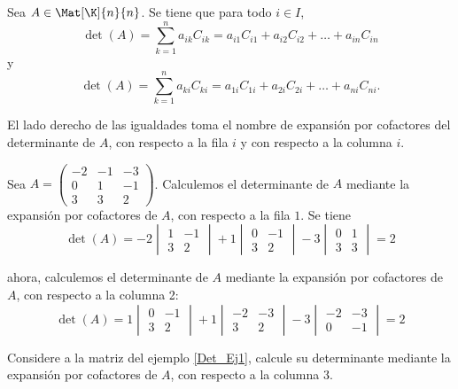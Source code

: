 \documentclass[compacto,10pt]{pubciencias-notas}
\begin{document}

\begin{teo}
    Sea $A \in \Mat[\K]{n}{n}$. Se tiene que para todo $i\in I$,
    \[
        \det(A) 
        = \sum_{k=1}^n a_{ik}C_{ik} 
        = a_{i1}C_{i1} + a_{i2}C_{i2} + \ldots + a_{in}C_{in}
    \]
    y
    \[
        \det(A) 
        = \sum_{k=1}^n a_{ki}C_{ki} 
        = a_{1i}C_{1i} + a_{2i}C_{2i} + \ldots + a_{ni}C_{ni}.
    \]
\end{teo}

\begin{advertencia}
    El lado derecho de las igualdades toma el nombre de expansión por cofactores del determinante de $A$, con respecto a la fila $i$ y con respecto a la columna $i$.
\end{advertencia}

\begin{ejem}\hspace{0pt}\label{Det_Ej1}
    Sea $A =
    \begin{pmatrix}
        -2 & -1 & -3 \\
        0 & 1 & -1 \\
        3 & 3 & 2
    \end{pmatrix}$.
    \noindent Calculemos el determinante de $A$ mediante la expansión por cofactores de $A$, con respecto a la fila $1$. Se tiene
    \[
        \det(A) = -2 
        \begin{vmatrix}
            1 & -1 \\
            3 & 2
        \end{vmatrix} +1
        \begin{vmatrix}
            0 & -1 \\
            3 & 2
        \end{vmatrix} -3
        \begin{vmatrix}
            0 & 1 \\
            3 & 3
        \end{vmatrix} = 2
    \]
    
    ahora, calculemos el determinante de $A$ mediante la expansión por cofactores de $A$, con respecto a la columna 2:
    \[
        \det(A) = 1 
        \begin{vmatrix}
            0 & -1 \\
            3 & 2
        \end{vmatrix} +1
        \begin{vmatrix}
            -2 & -3 \\
            3 & 2
        \end{vmatrix} -3
        \begin{vmatrix}
            -2 & -3 \\
            0 & -1
        \end{vmatrix} = 2
    \]
    
    \end{ejem}
    
    \begin{ejer}\hspace{0pt} Considere a la matriz del ejemplo \ref{Det_Ej1}, calcule su determinante mediante la expansión por cofactores de $A$, con respecto a la columna $3$.
\end{ejer}
\end{document}
